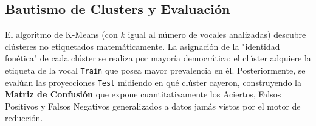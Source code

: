\documentclass[12pt, a4paper]{article}
\begin{document}
\subsection*{Bautismo de Clusters y Evaluación}
El algoritmo de K-Means (con $k$ igual al número de vocales analizadas) descubre clústeres no etiquetados matemáticamente. La asignación de la "identidad fonética" de cada clúster se realiza por mayoría democrática: el clúster adquiere la etiqueta de la vocal \texttt{Train} que posea mayor prevalencia en él. Posteriormente, se evalúan las proyecciones \texttt{Test} midiendo en qué clúster cayeron, construyendo la \textbf{Matriz de Confusión} que expone cuantitativamente los Aciertos, Falsos Positivos y Falsos Negativos generalizados a datos jamás vistos por el motor de reducción.
\end{document}
